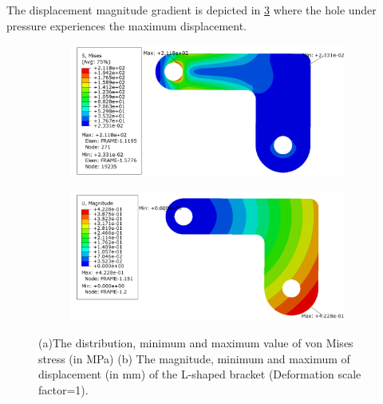 \documentclass{article}
\begin{document}
The displacement magnitude gradient is depicted in \cref{fig:frame_displacement} where the hole under pressure experiences the maximum displacement.

\begin{figure}[ht]
    \centering
        \begin{subfigure}{0.8\textwidth}
            \includegraphics[width=1\linewidth]{figures/frame_vm_stress.png} 
            \caption{}
            \label{fig:frame_vm_stress}
        \end{subfigure}
        
        \begin{subfigure}{0.8\textwidth}
            \includegraphics[width=1\linewidth]{figures/frame_displacement.png} 
            \caption{}
            \label{fig:frame_displacement}
        \end{subfigure}
    \caption{(a)The distribution, minimum and maximum value of von Mises stress (in MPa) (b) The magnitude, minimum and maximum of displacement (in mm) of the L-shaped bracket (Deformation scale factor=1).}
\end{figure}

%
%
\end{document}
